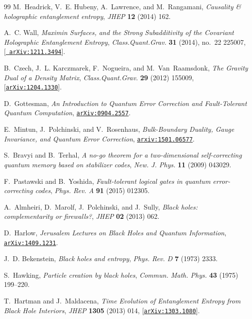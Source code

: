 \documentclass[12pt]{article}
\theoremstyle{plain}
\theoremstyle{plain}
\theoremstyle{plain}
\theoremstyle{plain}
\theoremstyle{result}
\theoremstyle{remark}
\theoremstyle{conjecture}
\theoremstyle{observation}
\theoremstyle{definition}
\theoremstyle{corollary}
\theoremstyle{definition}
\theoremstyle{definition}
\theoremstyle{assumption}
\theoremstyle{definition}
\theoremstyle{problem}
\theoremstyle{fact}
\begin{document}
\begin{thebibliography}{99}
M.~Headrick, V.~E. Hubeny, A.~Lawrence, and M.~Rangamani, {\it {Causality \&
  holographic entanglement entropy}},  {\em JHEP} {\bf 12} (2014) 162.

A.~C. Wall, {\it {Maximin Surfaces, and the Strong Subadditivity of the
  Covariant Holographic Entanglement Entropy}},  {\em Class.Quant.Grav.} {\bf
  31} (2014), no.~22 225007, [\href{http://arxiv.org/abs/1211.3494}{{\tt
  arXiv:1211.3494}}].

B.~Czech, J.~L. Karczmarek, F.~Nogueira, and M.~Van~Raamsdonk, {\it {The
  Gravity Dual of a Density Matrix}},  {\em Class.Quant.Grav.} {\bf 29} (2012)
  155009, [\href{http://arxiv.org/abs/1204.1330}{{\tt arXiv:1204.1330}}].

D.~Gottesman, {\it {An Introduction to Quantum Error Correction and
  Fault-Tolerant Quantum Computation}},
  \href{http://arxiv.org/abs/0904.2557}{{\tt arXiv:0904.2557}}.

E.~Mintun, J.~Polchinski, and V.~Rosenhaus, {\it {Bulk-Boundary Duality, Gauge
  Invariance, and Quantum Error Correction}},
  \href{http://arxiv.org/abs/arxiv:1501.06577}{{\tt arxiv:1501.06577}}.

S.~Bravyi and B.~Terhal, {\it A no-go theorem for a two-dimensional
  self-correcting quantum memory based on stabilizer codes},  {\em New. J.
  Phys.} {\bf 11} (2009) 043029.

F.~Pastawski and B.~Yoshida, {\it Fault-tolerant logical gates in quantum
  error-correcting codes},  {\em Phys. Rev. A} {\bf 91} (2015) 012305.

A.~Almheiri, D.~Marolf, J.~Polchinski, and J.~Sully, {\it Black holes:
  complementarity or firewalls?},  {\em JHEP} {\bf 02} (2013) 062.

D.~Harlow, {\it {Jerusalem Lectures on Black Holes and Quantum Information}},
  \href{http://arxiv.org/abs/1409.1231}{{\tt arXiv:1409.1231}}.

J.~D. Bekenstein, {\it Black holes and entropy},  {\em Phys. Rev. D} {\bf 7}
  (1973) 2333.

S.~Hawking, {\it Particle creation by black holes},  {\em Commun. Math. Phys.}
  {\bf 43} (1975) 199--220.

T.~Hartman and J.~Maldacena, {\it {Time Evolution of Entanglement Entropy from
  Black Hole Interiors}},  {\em JHEP} {\bf 1305} (2013) 014,
  [\href{http://arxiv.org/abs/1303.1080}{{\tt arXiv:1303.1080}}].


\end{thebibliography}
\end{document}
